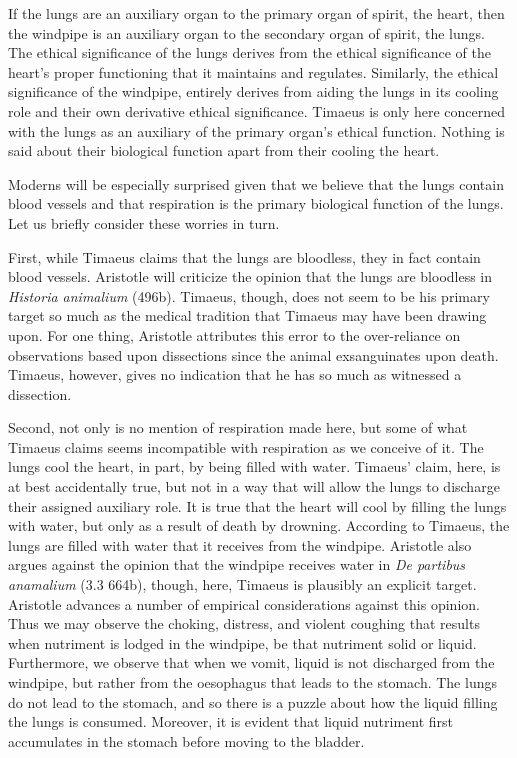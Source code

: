 If the lungs are an auxiliary organ to the primary organ of spirit, the heart, then the windpipe is an auxiliary organ to the secondary organ of spirit, the lungs. The ethical significance of the lungs derives from the ethical significance of the heart's proper functioning that it maintains and regulates. Similarly, the ethical significance of the windpipe, entirely derives from aiding the lungs in its cooling role and their own derivative ethical significance. Timaeus is only here concerned with the lungs as an auxiliary of the primary organ's ethical function. Nothing is said about their biological function apart from their cooling the heart. 

Moderns will be especially surprised given that we believe that the lungs contain blood vessels and that respiration is the primary biological function of the lungs. Let us briefly consider these worries in turn. 

First, while Timaeus claims that the lungs are bloodless, they in fact contain blood vessels. Aristotle will criticize the opinion that the lungs are bloodless in \emph{Historia animalium} (496b). Timaeus, though, does not seem to be his primary target so much as the medical tradition that Timaeus may have been drawing upon. For one thing, Aristotle attributes this error to the over-reliance on observations based upon dissections since the animal exsanguinates upon death. Timaeus, however, gives no indication that he has so much as witnessed a dissection. 

Second, not only is no mention of respiration made here, but some of what Timaeus claims seems incompatible with respiration as we conceive of it. The lungs cool the heart, in part, by being filled with water. Timaeus' claim, here, is at best accidentally true, but not in a way that will allow the lungs to discharge their assigned auxiliary role. It is true that the heart will cool by filling the lungs with water, but only as a result of death by drowning. According to Timaeus, the lungs are filled with water that it receives from the windpipe. Aristotle also argues against the opinion that the windpipe receives water in \emph{De partibus anamalium} (3.3 664b), though, here, Timaeus is plausibly an explicit target. Aristotle advances a number of empirical considerations against this opinion. Thus we may observe the choking, distress, and violent coughing that results when nutriment is lodged in the windpipe, be that nutriment solid or liquid. Furthermore, we observe that when we vomit, liquid is not discharged from the windpipe, but rather from the oesophagus that leads to the stomach. The lungs do not lead to the stomach, and so there is a puzzle about how the liquid filling the lungs is consumed. Moreover, it is evident that liquid nutriment first accumulates in the stomach before moving to the bladder.

